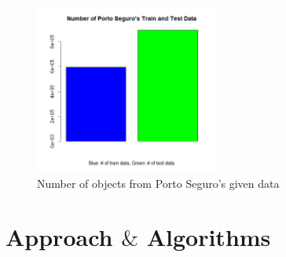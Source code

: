 \documentclass[fleqn,10pt]{SelfArx} %
\begin{document}
\begin{figure}[h]
\includegraphics[width=6cm]{Intro_pic.png}
\caption{Number of objects from Porto Seguro’s given data}
\end{figure}


\bigskip
\bigskip


\section{Approach $\&$ Algorithms} %
\end{document}
